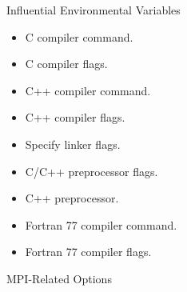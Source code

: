  Influential Environmental Variables

\begin{itemize}
\item {}

C compiler command.

\item {}

C compiler flags.

\item {}

C++ compiler command.

\item {}

C++ compiler flags.

\item {}

Specify linker flags.

\item {}

C/C++ preprocessor flags.

\item {}

C++ preprocessor.

\item {}

Fortran 77 compiler command.

\item {}

Fortran 77 compiler flags.
\end{itemize}

MPI-Related Options

